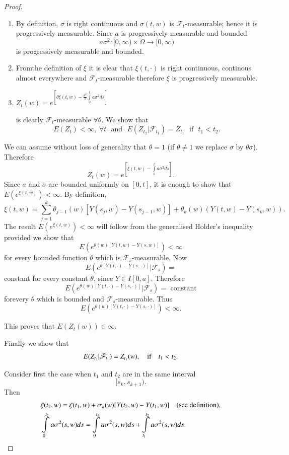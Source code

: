 \begin{proof}
\begin{enumerate}
\renewcommand{\theenumi}{\roman{enumi}}
\renewcommand{\labelenumi}{(\theenumi)}
\item By definition, $\sigma$ is right continuous and $\sigma(t,w)$ is
  $\mathscr{F}_{t}$-measurable; hence it is progressively
  measurable. Since $a$ is progressively measurable and bounded
$$
a\sigma^{2}:[0,\infty)\times \Omega\to [0,\infty)
$$
is progressively measurable and bounded.

\item From\pageoriginale the definition of $\xi$ it is clear that
  $\xi(t,\cdot)$ is right continuous, continous almost everywhere and
  $\mathscr{F}_{t}$-measurable therefore $\xi$ is progressively
  measurable.

\item
  $Z_{t}(w)=e^{[\theta\xi(t,w)-\frac{\theta^{2}}{2}\int\limits^{t}_{0}a\sigma^{2}ds]}$ 

is clearly $\mathscr{F}_{t}$-measurable $\forall \theta$. We show that
$$
E(Z_{t})<\infty,\ \forall t\text{~ and~ }
E(Z_{t_{2}}|\mathscr{F}_{t_{1}})=Z_{t_{1}}\text{~ if~ }t_{1}<t_{2}.
$$
\end{enumerate}

We can assume without loss of generality that $\theta=1$ (if
$\theta\neq 1$ we replace $\sigma$ by $\theta\sigma$). Therefore
$$
Z_{t}(w)=e^{[\xi(t,w)-\int\limits^{t}_{0}a\sigma^{2}ds]}.
$$
Since $a$ and $\sigma$ are bounded uniformly on $[0,t]$, it is enough
to show that $E(e^{\xi(t,w)})<\infty$. By definition,
$$
\xi(t,w)=\sum\limits^{k}_{j=1}\theta_{j-1}(w)[Y(s_{j},w)-Y(s_{j-1},w)]+\theta_{k}(w)(Y(t,w)-Y(s_{k},w)).
$$
The result $E(e^{\xi(t,w)})<\infty$ will follow from the generalised
Holder's inequality provided we show that
$$
E(e^{\theta(w)[Y(t,w)-Y(s,w)]})<\infty
$$
for every bounded function $\theta$ which is
$\mathscr{F}_{s}$-measurable. Now
$$
E(e^{\theta[Y(t,\cdot)-Y(s,\cdot)]}|\mathscr{F}_{s})=
$$ 
constant for every constant $\theta$, since $Y\in I[0,a]$. Therefore
$$
E(e^{\theta(w)[Y(t,\cdot)-Y(s,\cdot)]}|\mathscr{F}_{s})=\text{~constant}
$$
for\pageoriginale every $\theta$ which is bounded and
$\mathscr{F}_{s}$-measurable. Thus
$$
E(e^{\theta(w)[Y(t,\cdot)-Y(s,\cdot)]})<\infty.
$$

This proves that $E(Z_{t}(w))\in \infty$. 

Finally we show that
$$
E(Z_{t_{2}}|\mathscr{F}_{t_{1}})=Z_{t_{1}}(w),\quad\text{if}\quad
t_{1}<t_{2}.
$$

Consider first the case when $t_{1}$ and $t_{2}$ are in the same
interval 
$$
[s_{k},s_{k+1}).
$$ 
Then
\begin{align*}
& \xi(t_{2},w)=\xi(t_{1},w)+\sigma_{k}(w)[Y(t_{2},w)-Y(t_{1},w)]\quad\text{(see
  definition),}\\
& \int\limits^{t_{2}}_{0}a\sigma^{2}(s,w)ds=\int\limits^{t_{1}}_{0}a\sigma^{2}(s,w)ds+\int\limits^{t_{2}}_{t_{1}}a\sigma^{2}(s,w)ds.
\end{align*}


\end{proof}
